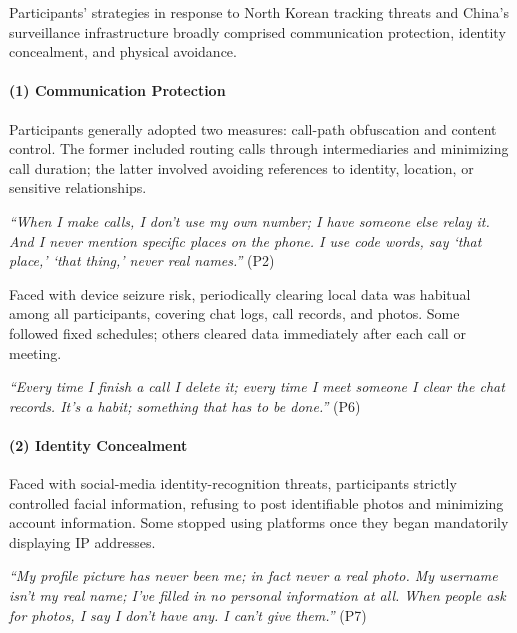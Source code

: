 \documentclass[conference,compsoc]{IEEEtran}
\begin{document}
Participants' strategies in response to North Korean tracking threats and China's surveillance infrastructure broadly comprised communication protection, identity concealment, and physical avoidance.

\paragraph{\textbf{(1) Communication Protection}}
Participants generally adopted two measures: call-path obfuscation and content control. The former included routing calls through intermediaries and minimizing call duration; the latter involved avoiding references to identity, location, or sensitive relationships.

\begin{displayquote}
\textit{``When I make calls, I don't use my own number; I have someone else relay it. And I never mention specific places on the phone. I use code words, say `that place,' `that thing,' never real names.''} (P2)
\end{displayquote}

Faced with device seizure risk, periodically clearing local data was habitual among all participants, covering chat logs, call records, and photos. Some followed fixed schedules; others cleared data immediately after each call or meeting.

\begin{displayquote}
\textit{``Every time I finish a call I delete it; every time I meet someone I clear the chat records. It's a habit; something that has to be done.''} (P6)
\end{displayquote}

\paragraph{\textbf{(2) Identity Concealment}}
Faced with social-media identity-recognition threats, participants strictly controlled facial information, refusing to post identifiable photos and minimizing account information. Some stopped using platforms once they began mandatorily displaying IP addresses.

\begin{displayquote}
\textit{``My profile picture has never been me; in fact never a real photo. My username isn't my real name; I've filled in no personal information at all. When people ask for photos, I say I don't have any. I can't give them.''} (P7)
\end{displayquote}
\end{document}
